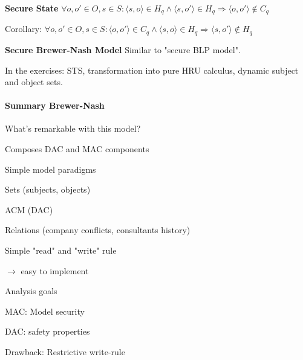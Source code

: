 \documentclass[a4paper]{article}
\renewcommand{\note}[2]{\begin{noteBox} \textbf{#1} #2 \end{noteBox}}
\begin{document}
\begin{multicols}{3}
    \note{Secure State}{$\forall o,o' \in O,s\in S:⟨s,o⟩\in H_q\wedge⟨s,o'⟩\in H_q\Rightarrow⟨o,o'⟩\not\in C_q$

        Corollary: $\forall o,o'\in O,s\in S:⟨o,o'⟩\in C_q\wedge⟨s,o⟩\in H_q\Rightarrow ⟨s,o'⟩\not\in H_q$
    }

    \note{Secure Brewer-Nash Model}{Similar to "secure BLP model".}

    In the exercises: STS, transformation into pure HRU calculus, dynamic subject and object sets.

    \paragraph{Summary Brewer-Nash}
    What’s remarkable with this model?
    \begin{itemize*}
        \item Composes DAC and MAC components
        \item Simple model paradigms
        \begin{itemize*}
            \item Sets (subjects, objects)
            \item ACM (DAC)
            \item Relations (company conflicts, consultants history)
            \item Simple "read" and "write" rule
            \item $\rightarrow$ easy to implement
        \end{itemize*}
        \item Analysis goals
        \begin{itemize*}
            \item MAC: Model security
            \item DAC: safety properties
        \end{itemize*}
        \item Drawback: Restrictive write-rule
    \end{itemize*}


\end{multicols}
\end{document}
